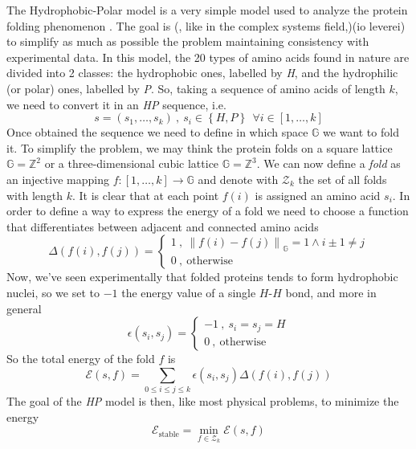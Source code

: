 The Hydrophobic-Polar model is a very simple model used to analyze the protein folding phenomenon \cite{PERM}.
The goal is (, like in the complex systems field,)(io leverei) to simplify as much as possible the problem maintaining consistency with experimental data.
In this model, the 20 types of amino acids found in nature are divided into 2 classes: the hydrophobic ones, labelled by \emph{H}, and the hydrophilic (or polar) ones, labelled by \emph{P}.
So, taking a sequence of amino acids of length $k$, we need to convert it in an \emph{HP} sequence, i.e.
\begin{equation*}
    s = \left(s_1, \ldots, s_k\right) \ , \ s_i \in \left\{H, P\right\} \ \ \forall i \in \left[1,\ldots,k\right]
\end{equation*}
Once obtained the sequence we need to define in which space $\mathbb{G}$ we want to fold it.
To simplify the problem, we may think the protein folds on a square lattice $\mathbb{G} = \mathbb{Z}^2$ or a three-dimensional cubic lattice $\mathbb{G} = \mathbb{Z}^3$.
We can now define a \emph{fold} as an injective mapping $f : \left[1,\ldots,k\right] \to \mathbb{G}$ and denote with $\mathcal{Z}_k$ the set of all folds with length $k$.
It is clear that at each point $f(i)$ is assigned an amino acid $s_i$.
In order to define a way to express the energy of a fold we need to choose a function that differentiates between adjacent and connected amino acids
\begin{equation*}
    \Delta\left(f(i),f(j)\right) =
    \begin{cases}
        1 \ , \ {\left\lVert f(i) - f(j) \right\rVert}_\mathbb{G} = 1 \land i \pm 1 \neq j\\
        0 \ , \ \text{otherwise}
    \end{cases}
\end{equation*}
Now, we've seen experimentally that folded proteins tends to form hydrophobic nuclei, so we set to $-1$ the energy value of a single $H$-$H$ bond, and more in general
\begin{equation*}
    \epsilon\left(s_i,s_j\right) =
    \begin{cases}
        -1 \ , \ s_i = s_j = H\\
        0 \ , \ \text{otherwise}
    \end{cases}
\end{equation*}
So the total energy of the fold $f$ is
\begin{equation*}
    \mathcal{E}(s,f) = \sum_{0 \leq i \leq j \leq k} \epsilon\left(s_i,s_j\right)\Delta\left(f(i),f(j)\right)
\end{equation*}
The goal of the \emph{HP} model is then, like most physical problems, to minimize the energy
\begin{equation*}
    \mathcal{E}_\text{stable} = \min_{f \in \mathcal{Z}_k} \mathcal{E}(s,f)
\end{equation*}
